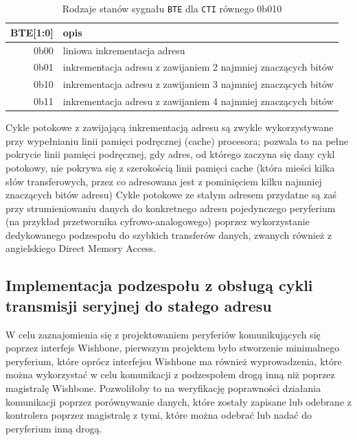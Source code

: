 \begin{table}[H]
\begin{center}
\begin{tabular}{ r|l }
 BTE[1:0] & opis \\ 
 \hline
 0b00 & liniowa inkrementacja adresu \\
 0b01 & inkrementacja adresu z zawijaniem 2 najmniej znaczących bitów \\
 0b10 & inkrementacja adresu z zawijaniem 3 najmniej znaczących bitów \\
 0b11 & inkrementacja adresu z zawijaniem 4 najmniej znaczących bitów \\
 \hline
\end{tabular}
\end{center}
\caption{\label{tab:signal-states-bte}Rodzaje stanów sygnału \texttt{BTE} dla \texttt{CTI} równego 0b010}
\end{table}

Cykle potokowe z zawijającą inkrementacją adresu są zwykle wykorzystywane przy wypełnianiu linii pamięci podręcznej (cache) procesora; pozwala to na pełne pokrycie linii pamięci podręcznej, gdy adres, od którego zaczyna się dany cykl potokowy, nie pokrywa się z szerokością linii pamięci cache (która mieści kilka słów transferowych, przez co adresowana jest z pominięciem kilku najmniej znaczących bitów adresu)
Cykle potokowe ze stałym adresem przydatne są zaś przy strumieniowaniu danych do konkretnego adresu pojedynczego peryferium (na przykład przetwornika cyfrowo-analogowego) poprzez wykorzystanie dedykowanego podzespołu do szybkich transferów danych, zwanych również z angielskiego Direct Memory Access.

\subsection{Implementacja podzespołu z obsługą cykli transmisji seryjnej do stałego adresu}

W celu zaznajomienia się z projektowaniem peryferiów komunikujących się poprzez interfejs Wishbone, pierwszym projektem było stworzenie minimalnego peryferium, które oprócz interfejsu Wishbone ma również wyprowadzenia, które można wykorzystać w celu komunikacji z podzespołem drogą inną niż poprzez magistralę Wishbone. Pozwoliłoby to na weryfikację poprawności działania komunikacji poprzez porównywanie danych, które zostały zapisane lub odebrane z kontrolera poprzez magistralę z tymi, które można odebrać lub nadać do peryferium inną drogą.

